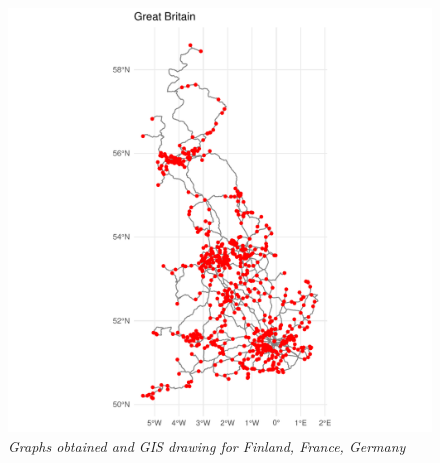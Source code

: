 \begin{figure}
	\includegraphics[width=0.34\linewidth]{images/GBReal.pdf}
	\vspace{-5pt}
	\caption{\textit{Graphs obtained and GIS drawing for Finland, France, Germany}}
	\label{fig:country}
\end{figure}
